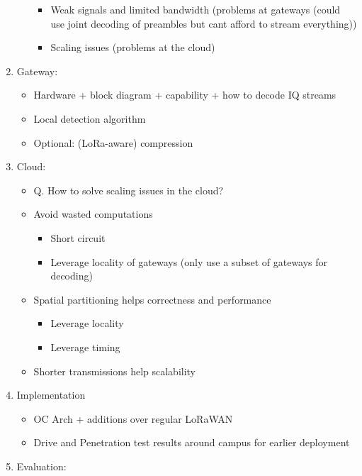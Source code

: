 \begin{enumerate}
\begin{itemize}
\begin{itemize}
                    \item Weak signals and limited bandwidth (problems at gateways (could use joint decoding of preambles but cant afford to stream everything))
                    \item Scaling issues (problems at the cloud)
                \end{itemize}
        \end{itemize}
    \item Gateway:
        \begin{itemize}
            \item Hardware + block diagram + capability + how to decode IQ streams
            \item Local detection algorithm
            \item Optional: (LoRa-aware) compression
        \end{itemize}
    \item Cloud:
        \begin{itemize}
            \item Q. How to solve scaling issues in the cloud?
            \item Avoid wasted computations
                \begin{itemize}
                    \item Short circuit
                    \item Leverage locality of gateways (only use a subset of gateways for decoding)
                \end{itemize}
            \item Spatial partitioning helps correctness and performance
                \begin{itemize}
                    \item Leverage locality
                    \item Leverage timing
                \end{itemize}
            \item Shorter transmissions help scalability
        \end{itemize}
    \item Implementation
     \begin{itemize}
         \item OC Arch + additions over regular LoRaWAN
         \item Drive and Penetration test results around campus for earlier deployment
     \end{itemize}
    \item Evaluation:

\end{enumerate}
